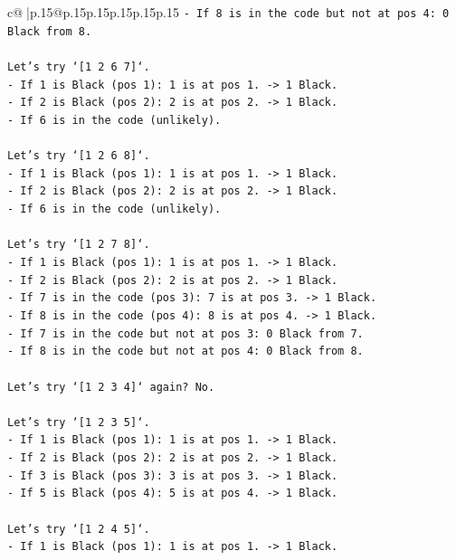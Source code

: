 \documentclass{article}
\begin{document}
{\begin{supertabular}{c@{$\;$}|p{.15\linewidth}@{}p{.15\linewidth}p{.15\linewidth}p{.15\linewidth}p{.15\linewidth}p{.15\linewidth}}
{{{\texttt{{-} If 8 is in the code but not at pos 4: 0 Black from 8.} \\
\\ 
\texttt{Let's try `{[}1 2 6 7{]}`.} \\
\texttt{{-} If 1 is Black (pos 1): 1 is at pos 1. {-}> 1 Black.} \\
\texttt{{-} If 2 is Black (pos 2): 2 is at pos 2. {-}> 1 Black.} \\
\texttt{{-} If 6 is in the code (unlikely).} \\
\\ 
\texttt{Let's try `{[}1 2 6 8{]}`.} \\
\texttt{{-} If 1 is Black (pos 1): 1 is at pos 1. {-}> 1 Black.} \\
\texttt{{-} If 2 is Black (pos 2): 2 is at pos 2. {-}> 1 Black.} \\
\texttt{{-} If 6 is in the code (unlikely).} \\
\\ 
\texttt{Let's try `{[}1 2 7 8{]}`.} \\
\texttt{{-} If 1 is Black (pos 1): 1 is at pos 1. {-}> 1 Black.} \\
\texttt{{-} If 2 is Black (pos 2): 2 is at pos 2. {-}> 1 Black.} \\
\texttt{{-} If 7 is in the code (pos 3): 7 is at pos 3. {-}> 1 Black.} \\
\texttt{{-} If 8 is in the code (pos 4): 8 is at pos 4. {-}> 1 Black.} \\
\texttt{{-} If 7 is in the code but not at pos 3: 0 Black from 7.} \\
\texttt{{-} If 8 is in the code but not at pos 4: 0 Black from 8.} \\
\\ 
\texttt{Let's try `{[}1 2 3 4{]}` again? No.} \\
\\ 
\texttt{Let's try `{[}1 2 3 5{]}`.} \\
\texttt{{-} If 1 is Black (pos 1): 1 is at pos 1. {-}> 1 Black.} \\
\texttt{{-} If 2 is Black (pos 2): 2 is at pos 2. {-}> 1 Black.} \\
\texttt{{-} If 3 is Black (pos 3): 3 is at pos 3. {-}> 1 Black.} \\
\texttt{{-} If 5 is Black (pos 4): 5 is at pos 4. {-}> 1 Black.} \\
\\ 
\texttt{Let's try `{[}1 2 4 5{]}`.} \\
\texttt{{-} If 1 is Black (pos 1): 1 is at pos 1. {-}> 1 Black.} \\
}}}
\end{supertabular}}
\end{document}
